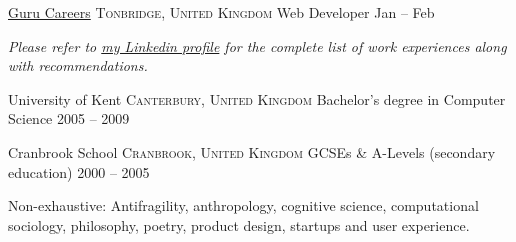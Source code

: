 \documentclass[10pt,a4paper]{article}
\begin{document}
\headedsection
  {\href{http://gurucareers.com}{Guru Careers}}
  {\textsc{Tonbridge, United Kingdom}} {%
  \headedsubsection
    {Web Developer}
    {Jan  -- Feb }
    {}
}

\begin{center}
  \emph{Please refer to \href{http://www.linkedin.com/in/heyseb}{my Linkedin profile} for the complete list of work experiences along with recommendations.}
\end{center}


\spacedhrule{-0.2em}{-0.4em}


\headedsection
  {University of Kent}
  {\textsc{Canterbury, United Kingdom}} {%
  \headedsubsection
    {Bachelor's degree in Computer Science}
    {2005 -- 2009}
    {
  }
}

\headedsection
  {Cranbrook School}
  {\textsc{Cranbrook, United Kingdom}} {%
  \headedsubsection
    {GCSEs \& A-Levels \textnormal{(secondary education)}}
    {2000 -- 2005}
    {\bodytext{}
  }
}

\spacedhrule{0em}{-0.4em}


\inlineheadsection
  {Non-exhaustive:}
  {Antifragility, anthropology, cognitive science, computational sociology, philosophy, poetry, product design, startups and user experience.}
\end{document}
